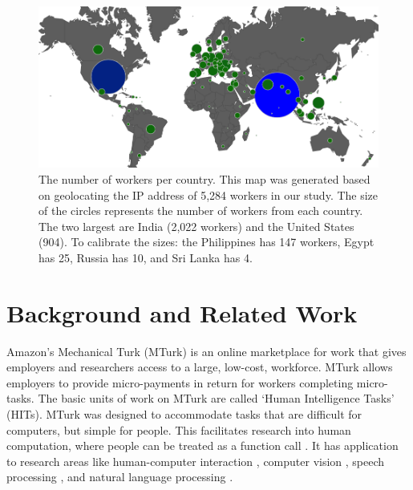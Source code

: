 \documentclass[11pt]{article}
\begin{document}
\begin{figure}[h]
\centering
\includegraphics[width=\linewidth]{figures/turkermap-color-cropped}
\caption{The number of workers per country.  This map was generated based on geolocating the IP address of  5,284 workers in our study.  The size of the circles represents the number of workers from each country.  The two largest are India (2,022 workers) and the United States (904).  To calibrate the sizes: the Philippines has 147 workers, Egypt has 25, Russia has 10, and Sri Lanka has 4.}
\label{map}
\end{figure}



\section{Background and Related Work}
Amazon's Mechanical Turk (MTurk) is an online marketplace for work that gives employers and researchers access to a large, low-cost, workforce. MTurk allows employers to provide micro-payments in return for workers completing micro-tasks.  The basic units of work on MTurk are called `Human Intelligence Tasks' (HITs).  MTurk was designed to accommodate tasks that are difficult for computers, but simple for people. This facilitates research into human computation, where people can be treated as a function call \cite{vonAhnThesis,Little2009,quinn-bederson:2011}.  It has application to research areas like human-computer interaction \cite{bigham-et-al:2010,bernstein-et-al:2010}, computer vision  \cite{sorkin-forsyth:2008,deng-et-al:2010,rashtchian:10}, speech processing \cite{marge:10,lane-EtAl:2010:MTURK,Parent-Eskenazi:2011,Eskenazi:2013:crowdsourcing-speech-book},  and natural language processing \cite{Snow2008,callisonburch-dredze:2010:MTURK,laws-scheible-schutze:2011:EMNLP}. 
\end{document}

